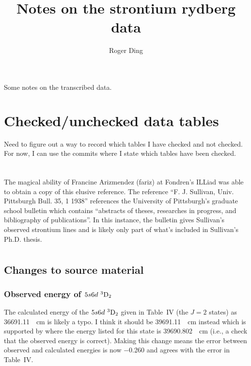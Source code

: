 \documentclass{article}
\title{Notes on the strontium rydberg data}
\author{Roger Ding}
\newcommand{\tsup}{\textsuperscript}													%
\newcommand{\tsub}{\textsubscript}														%
\newcommand{\SLJ}[3]{\tsup{#1}\textnormal{#2}\tsub{#3}}
\newcommand{\nSLJ}[4]{{#1}\textnormal{ }\SLJ{#2}{#3}{#4}}
\begin{document}
\maketitle


Some notes on the transcribed data.

\section{Checked/unchecked data tables}

Need to figure out a way to record which tables I have checked and not checked. For now, I can use the commits where I state which tables have been checked.

\section{}

The magical ability of Francine Arizmendez (fariz) at Fondren's ILLiad was able to obtain a copy of this elusive reference. The reference ``F. J. Sullivan, Univ. Pittsburgh Bull. 35, 1 1938'' references the University of Pittsburgh's graduate school bulletin which contains ``abstracts of theses, researches in progress, and bibliography of publications''. In this instance, the bulletin gives Sullivan's observed strontium lines and is likely only part of what's included in Sullivan's Ph.D. thesis. 

\section{}

\subsection{Changes to source material}

\subsubsection{Observed energy of $\nSLJ{5s6d}{3}{D}{2}$}

The calculated energy of the $\nSLJ{5s6d}{3}{D}{2}$ given in Table~IV (the ${J=2}$ states) as \SI{36691.11}{\per\cm} is likely a typo. I think it should be \SI{39691.11}{\per\cm} instead which is supported by \cite{san_2010} where the energy listed for this state is \SI{39690.802}{\per\cm} (i.e., a check that the observed energy is correct). Making this change means the error between observed and calculated energies is now \num{-0.260} and agrees with the error in Table~IV.
\end{document}
